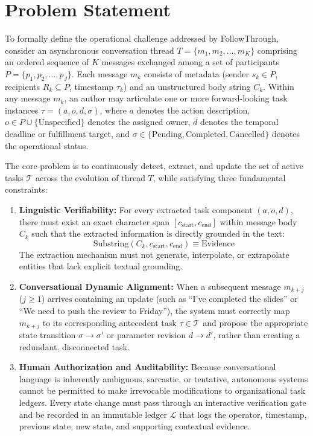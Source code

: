 \documentclass[conference]{IEEEtran}
\begin{document}
\section{Problem Statement}
To formally define the operational challenge addressed by FollowThrough, consider an asynchronous conversation thread $T = \{m_1, m_2, \dots, m_K\}$ comprising an ordered sequence of $K$ messages exchanged among a set of participants $P = \{p_1, p_2, \dots, p_J\}$. Each message $m_k$ consists of metadata (sender $s_k \in P$, recipients $R_k \subseteq P$, timestamp $\tau_k$) and an unstructured body string $C_k$. Within any message $m_k$, an author may articulate one or more forward-looking task instances $\tau = (a, o, d, \sigma)$, where $a$ denotes the action description, $o \in P \cup \{\text{Unspecified}\}$ denotes the assigned owner, $d$ denotes the temporal deadline or fulfillment target, and $\sigma \in \{\text{Pending}, \text{Completed}, \text{Cancelled}\}$ denotes the operational status.

The core problem is to continuously detect, extract, and update the set of active tasks $\mathcal{T}$ across the evolution of thread $T$, while satisfying three fundamental constraints:
\begin{enumerate}
    \item \textbf{Linguistic Verifiability:} For every extracted task component $(a, o, d)$, there must exist an exact character span $[c_{\text{start}}, c_{\text{end}}]$ within message body $C_k$ such that the extracted information is directly grounded in the text:
    \begin{equation}
        \text{Substring}(C_k, c_{\text{start}}, c_{\text{end}}) \equiv \text{Evidence}
    \end{equation}
    The extraction mechanism must not generate, interpolate, or extrapolate entities that lack explicit textual grounding.
    \item \textbf{Conversational Dynamic Alignment:} When a subsequent message $m_{k+j}$ ($j \ge 1$) arrives containing an update (such as ``I've completed the slides'' or ``We need to push the review to Friday''), the system must correctly map $m_{k+j}$ to its corresponding antecedent task $\tau \in \mathcal{T}$ and propose the appropriate state transition $\sigma \to \sigma'$ or parameter revision $d \to d'$, rather than creating a redundant, disconnected task.
    \item \textbf{Human Authorization and Auditability:} Because conversational language is inherently ambiguous, sarcastic, or tentative, autonomous systems cannot be permitted to make irrevocable modifications to organizational task ledgers. Every state change must pass through an interactive verification gate and be recorded in an immutable ledger $\mathcal{L}$ that logs the operator, timestamp, previous state, new state, and supporting contextual evidence.
\end{enumerate}
\end{document}
